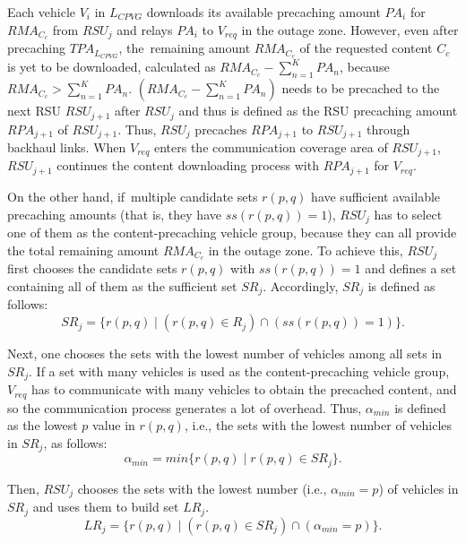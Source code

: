 \documentclass[sensors,aricle,accept,pdftex,moreauthors]{Definitions/mdpi}
\begin{document}
Each vehicle $V_{i}$ in $L_{CPVG}$ downloads its available precaching amount $PA_{i}$ for $RMA_{C_{c}}$ from $RSU_{j}$ and relays $PA_{i}$ to $V_{req}$ in the outage zone.
However, even after precaching $TPA_{L_{CPVG}}$, the~remaining amount $RMA_{C_{c}}$ of the requested content $C_{c}$ is yet to be downloaded, calculated as $RMA_{C_{c}} - \sum^{K}_{n=1}PA_{n}$, because~$RMA_{C_{c}} > \sum^{K}_{n=1}PA_{n}$.
$(RMA_{C_{c}} - \sum^{K}_{n=1}PA_{n})$ needs to be precached to the next RSU $RSU_{j+1}$ after $RSU_{j}$ and thus is defined as the RSU precaching amount $RPA_{j+1}$ of $RSU_{j+1}$.
Thus, $RSU_{j}$ precaches $RPA_{j+1}$ to $RSU_{j+1}$ through backhaul links.
When $V_{req}$ enters the communication coverage area of $RSU_{j+1}$, $RSU_{j+1}$ continues the content downloading process with $RPA_{j+1}$ for $V_{req}$. 

On the other hand, if~multiple candidate sets $r(p,q)$ have sufficient available precaching amounts (that is, they have $ss(r(p,q))=1$), $RSU_{j}$ has to select one of them as the content-precaching vehicle group, because they can all provide the total remaining amount $RMA_{C_{c}}$ in the outage zone.
To achieve this, $RSU_{j}$ first chooses the candidate sets $r(p,q)$ with $ss(r(p,q))=1$ and defines a set containing all of them as the sufficient set $SR_{j}$.
Accordingly, $SR_{j}$ is defined as follows:
\begin{equation}
    SR_{j}=\{r(p,q)\mid (r(p,q)\in R_{j})\cap (ss(r(p,q))=1) \}.
\end{equation}


Next, one chooses the sets with the lowest number of vehicles among all sets in $SR_{j}$.
If a set with many vehicles is used as the content-precaching vehicle group, $V_{req}$ has to communicate with many vehicles to obtain the precached content, and so the communication process generates a lot of overhead.
Thus, $\alpha_{min}$ is defined as the lowest $p$ value in $r(p,q)$, i.e., the sets with the lowest number of vehicles in $SR_{j}$, as follows:
\begin{equation}
    \alpha_{min}=min\{r(p,q) \mid r(p,q)\in SR_{j}\}.
\end{equation}


Then, $RSU_{j}$ chooses the sets with the lowest number (i.e., $\alpha_{min}=p$) of vehicles in $SR_{j}$ and uses them to build set $LR_{j}$.
\begin{equation}
    LR_{j}=\{r(p,q)\mid (r(p,q)\in SR_{j}) \cap (\alpha_{min}=p)\}.
\end{equation}
\end{document}
